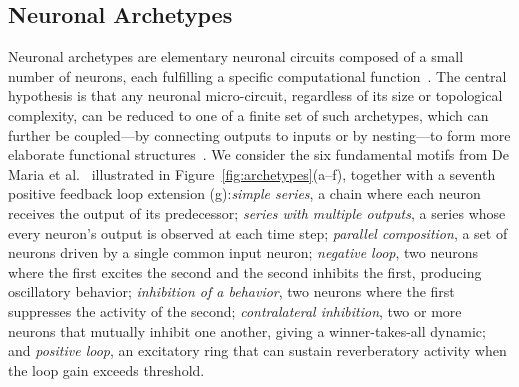 \documentclass[
]{ceurart}
\begin{document}
\subsection{Neuronal Archetypes}
\label{sec:archetypes}

Neuronal archetypes are elementary neuronal circuits composed of a small
number of neurons, each fulfilling a specific computational
function~\cite{DeMaria2020}. The central hypothesis is that any neuronal
micro-circuit, regardless of its size or topological complexity, can be
reduced to one of a finite set of such archetypes, which can further be
coupled---by connecting outputs to inputs or by nesting---to form more
elaborate functional structures~\cite{DeMaria2020,DeMaria2017}. We consider
the six fundamental motifs from De Maria et al.~\cite{DeMaria2020}
illustrated in Figure~\ref{fig:archetypes}(a--f), together with a seventh
positive feedback loop extension (g):\emph{simple series}, a chain where each neuron receives the output of its
predecessor; \emph{series with multiple outputs}, a series whose every
neuron's output is observed at each time step; \emph{parallel composition},
a set of neurons driven by a single common input neuron; \emph{negative
loop}, two neurons where the first excites the second and the second
inhibits the first, producing oscillatory behavior; \emph{inhibition of a
behavior}, two neurons where the first suppresses the activity of the
second; \emph{contralateral inhibition}, two or more neurons that mutually
inhibit one another, giving a winner-takes-all dynamic; and \emph{positive
loop}, an excitatory ring that can sustain reverberatory activity when the
loop gain exceeds threshold.
\end{document}
